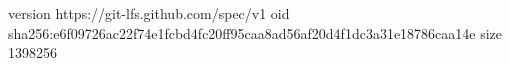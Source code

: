 version https://git-lfs.github.com/spec/v1
oid sha256:e6f09726ac22f74e1fcbd4fc20ff95caa8ad56af20d4f1dc3a31e18786caa14e
size 1398256
